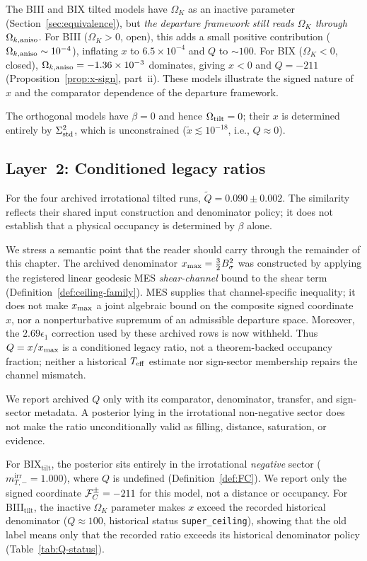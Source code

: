 The BIII and BIX tilted models have $\Omega_K$ as an
inactive parameter (Section~\ref{sec:equivalence}), but
\emph{the departure framework still reads $\Omega_K$
through $\Omega_{k,\mathrm{aniso}}$}.  For BIII ($\Omega_K > 0$, open), this
adds a small positive contribution ($\Omega_{k,\mathrm{aniso}} \sim 10^{-4}$),
inflating $x$ to $6.5 \times 10^{-4}$ and $Q$ to $\sim 100$.
For BIX ($\Omega_K < 0$, closed), $\Omega_{k,\mathrm{aniso}} = -1.36 \times
10^{-3}$ dominates, giving $x < 0$ and $Q = -211$
(Proposition~\ref{prop:x-sign}, part~ii).  These models
illustrate the signed nature of $x$ and the comparator
dependence of the departure framework.

The orthogonal models have $\beta = 0$ and hence $\Omega_{\mathrm{tilt}} = 0$;
their $x$ is determined entirely by $\Sigma^2_{\mathrm{std}}$, which is
unconstrained ($\tilde{x} \lesssim 10^{-18}$, i.e., $Q \approx 0$).


\subsection{Layer~2: Conditioned legacy ratios}
\label{sec:layer2-results}

For the four archived irrotational tilted runs,
$\tilde{Q}=0.090\pm0.002$.  The similarity reflects their shared
input construction and denominator policy; it does not establish
that a physical occupancy is determined by $\beta$ alone.

We stress a semantic point that the reader should carry through
the remainder of this chapter.  The archived denominator $x_{\max} =
\frac{3}{2}B_\sigma^2$ was constructed by applying the registered
linear geodesic MES \emph{shear-channel} bound to the shear term
(Definition~\ref{def:ceiling-family}).  MES supplies that
channel-specific inequality; it does not make $x_{\max}$ a joint
algebraic bound on the composite signed coordinate $x$, nor a
nonperturbative supremum of an admissible departure space.  Moreover,
the $2.69\epsilon_1$ correction used by these archived rows is now
withheld.  Thus $Q=x/x_{\max}$ is a conditioned legacy ratio, not a
theorem-backed occupancy fraction; neither a historical $T_{\mathrm{eff}}$
estimate nor sign-sector membership repairs the channel mismatch.

We report archived $Q$ only with its comparator, denominator,
transfer, and sign-sector metadata.  A posterior lying in the
irrotational non-negative sector does not make the ratio
unconditionally valid as filling, distance, saturation, or
evidence.

For BIX$_{\mathrm{tilt}}$, the posterior sits entirely in the
irrotational \emph{negative} sector
($m_{T,-}^{\mathrm{irr}} = 1.000$), where $Q$ is undefined
(Definition~\ref{def:FC}).  We report only the signed
coordinate $\mathcal{F}_C^{\pm} = -211$ for this model, not a distance or
occupancy.  For BIII$_{\mathrm{tilt}}$, the inactive $\Omega_K$
parameter makes $x$ exceed the recorded historical denominator
($Q \approx 100$, historical status \texttt{super\_ceiling}),
showing that the old label means only that the recorded ratio exceeds
its historical denominator policy
(Table~\ref{tab:Q-status}).

